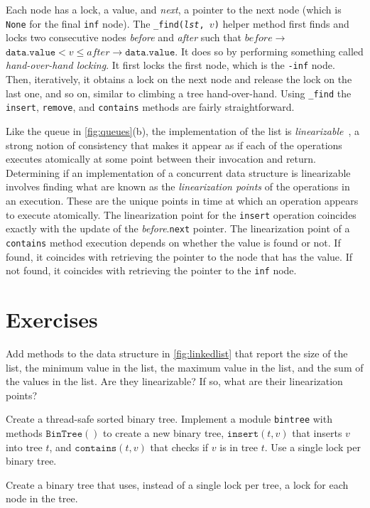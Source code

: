 \documentclass{report}
\begin{document}
%
Each node has a lock, a value, and \textit{next}, a pointer to the next node
(which is \texttt{None} for the final \texttt{inf} node).
The \texttt{\_find(\textit{lst}, $v$)} helper method first
finds and locks two consecutive nodes \textit{before} and \textit{after}
such that $\mathit{before}$$\rightarrow$$\mathtt{data.value} < v \le \mathit{after}$$\rightarrow$$\mathtt{data.value}$.
It does so by performing something called \emph{hand-over-hand locking}.
It first locks the first node, which is the \texttt{-inf} node.
Then, iteratively, it obtains a lock on the next node and release the
lock on the last one, and so on, similar to climbing a tree
hand-over-hand.
Using \texttt{\_find} the \texttt{insert}, \texttt{remove}, and \texttt{contains}
methods are fairly straightforward.

%
Like the queue in \autoref{fig:queues}(b), the implementation of the list is
\emph{linearizable}~\cite{HW90},
%
a strong notion of consistency that
makes it appear as if each of the operations executes atomically at
some point between their invocation and return.
Determining if an implementation of a concurrent data structure
is linearizable involves finding what are known as the
\emph{linearization points}
%
of the operations in an execution.  These are the unique
points in time at which an operation appears to execute atomically.
The linearization point for the \texttt{insert} operation coincides exactly with the update
of the \textit{before}.\texttt{next} pointer.
The linearization point of a \texttt{contains} method
execution depends on whether the value is found or not.
If found, it coincides with retrieving the pointer to the node
that has the value.
If not found, it coincides with retrieving the pointer to the
\texttt{inf} node.

\section*{Exercises}
\begin{problems}
\item Add methods to the data structure in \autoref{fig:linkedlist}
that report the size of the list, the minimum value in the
list, the maximum value in the list, and the sum of the values in the list.
Are they linearizable?  If so, what are their linearization points?
\item Create a thread-safe sorted binary tree.  Implement a module \texttt{bintree}
with methods
$\mathtt{BinTree}()$ to create a new binary tree, $\mathtt{insert}(t, v)$ that inserts $v$ into
tree $t$, and $\mathtt{contains}(t, v)$ that checks if $v$ is in tree $t$.  Use a single
lock per binary tree.
\item Create a binary tree that uses, instead of a single lock per tree,
a lock for each node in the tree.
\end{problems}
\end{document}

